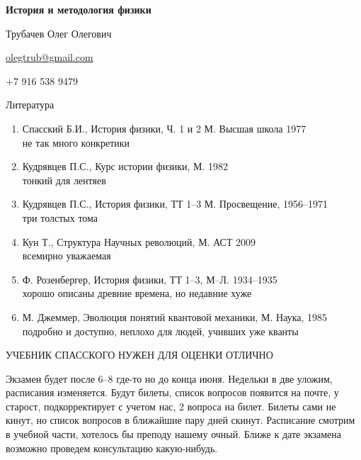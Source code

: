 \documentclass[a4paper, 12pt]{article}
\begin{document}
\null
\vfill

\begin{center}
	\begin{Large}
		\textbf{История и методология физики}
	\end{Large}

	\vspace{\baselineskip}

	Трубачев Олег Олегович

	\href{mailto:olegtrub@gmail.com}{olegtrub@gmail.com}

	+7 916 538 9479
\end{center}

\vfill

Литература
\begin{enumerate}
	\item Спасский Б.И., История физики, Ч. 1 и 2 М. Высшая школа 1977
		\\ не так много конкретики
	\item Кудрявцев П.С., Курс истории физики, М. 1982
		\\ тонкий для лентяев
	\item Кудрявцев П.С., История физики, ТТ 1--3 М. Просвещение, 1956--1971
		\\ три толстых тома
	\item Кун Т., Структура Научных революций, М. АСТ 2009
		\\ всемирно уважаемая
	\item Ф. Розенбергер, История физики, ТТ 1--3, М--Л. 1934--1935
		\\ хорошо описаны древние времена, но недавние хуже
	\item М. Джеммер, Эволюция понятий квантовой механики, М. Наука, 1985
		\\ подробно и доступно, неплохо для людей, учивших уже кванты
\end{enumerate}

УЧЕБНИК СПАССКОГО НУЖЕН ДЛЯ ОЦЕНКИ ОТЛИЧНО

Экзамен будет после 6--8 где-то но до конца июня. Недельки в две уложим, 
расписания изменяется. Будут билеты, список вопросов появится на почте, 
у старост, подкорректирует с учетом нас, 2 вопроса на билет. Билеты сами 
не кинут, но список вопросов в ближайшие пару дней скинут. Расписание 
смотрим в учебной части, хотелось бы преподу нашему очный. Ближе к дате 
экзамена возможно проведем консультацию какую-нибудь.

\clearpage
\end{document}
